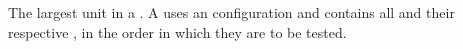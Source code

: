 
\item[\gdsuite]{
The largest unit in a  \GD \gdproject{}. 
 A \gdsuite uses an \gdaut configuration and contains all \gdcases and their respective \gdsteps, in the order in which they are to be tested.
}
